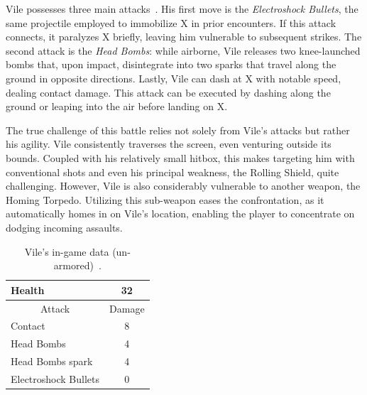 Vile possesses three main attacks~\cite{wiki:Vile}. His first move is the \emph{Electroshock Bullets}, the same projectile employed to immobilize X in prior encounters. If this attack connects, it paralyzes X briefly, leaving him vulnerable to subsequent strikes. The second attack is the \emph{Head Bombs}: while airborne, Vile releases two knee-launched bombs that, upon impact, disintegrate into two sparks that travel along the ground in opposite directions. Lastly, Vile can dash at X with notable speed, dealing contact damage. This attack can be executed by dashing along the ground or leaping into the air before landing on X.

The true challenge of this battle relies not solely from Vile's attacks but rather his agility. Vile consistently traverses the screen, even venturing outside its bounds. Coupled with his relatively small hitbox, this makes targeting him with conventional shots and even his principal weakness, the Rolling Shield, quite challenging. However, Vile is also considerably vulnerable to another weapon, the Homing Torpedo. Utilizing this sub-weapon eases the confrontation, as it automatically homes in on Vile's location, enabling the player to concentrate on dodging incoming assaults.

\begin{table}
	\centering
	\begin{tabular}[htp]{l c}
		\toprule
		Health  & 32\\
		\midrule
		\multicolumn{1}{c}{Attack} & \multicolumn{1}{c}{Damage}\\
		Contact & 8\\
		Head Bombs & 4\\
		Head Bombs spark & 4\\
		Electroshock Bullets & 0\\
		\bottomrule
	\end{tabular}
	\caption{Vile's in-game data (un-armored)~\cite{wiki:Vile,book:Compendium}. }
\end{table}

